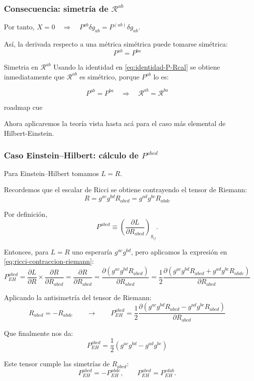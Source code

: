 \documentclass{beamer}
\newcommand{\Rcal}{\mathcal{R}}
\newcommand{\Eq}[1]{\eqref{#1}}
\newcommand{\RoadmapCue}[1]{%
    \begin{beamercolorbox}[
        wd=\textwidth,
        sep=.55ex,
        leftskip=.8ex,
        rounded=true
    ]{roadmap cue}

    \scriptsize
    \enspace #1

    \end{beamercolorbox}

    \vspace{.25em}
}
\begin{document}
\begin{frame}[label=nav-frame-017]
\frametitle{Consecuencia: simetría de \(\mathcal R^{ab}\)}

Por tanto, $X=0 \quad \Rightarrow \quad P^{ab}\delta g_{ab}=P^{(ab)}\delta g_{ab}$.

Así, la derivada respecto a una métrica simétrica puede tomarse simétrica:
\[
\boxed{P^{ab}=P^{ba}}
\]

\begin{block}{Simetria en $\Rcal^{ab}$}
Usando la identidad en \Eq{eq:identidad-P-Rcal} se obtiene inmediatamente que $\Rcal^{ab}$ es simétrico, porque $P^{ab}$ lo es:

\begin{equation}
P^{ab}=P^{ba}
\quad\Longrightarrow\quad
\Rcal^{ab}=\Rcal^{ba}
\label{eq:simetria-Rcal}
\end{equation}

\end{block}

\RoadmapCue{
Ahora aplicaremos la teoría vista hasta acá para el caso más elemental de Hilbert-Einstein.
}

\end{frame}

\begin{frame}[label=nav-frame-018]
\frametitle{Caso Einstein--Hilbert: cálculo de \(P^{abcd}\)}
\scriptsize

Para Einstein--Hilbert tomamos $L=R$.

Recordemos que el escalar de Ricci se obtiene contrayendo el tensor de Riemann:
\begin{equation}
R=g^{ac}g^{bd}R_{abcd} = g^{ad}g^{bc}R_{abdc}
\label{eq:ricci-contraccion-riemann}
\end{equation}

Por definición,
\[
P^{abcd}\equiv
\left(
\frac{\partial L}{\partial R_{abcd}}
\right)_{g_{ij}}.
\]

Entonces, para \(L=R\) uno esperaría \(g^{ac}g^{bd}\), pero aplicamos la expresión en \Eq{eq:ricci-contraccion-riemann}:
\[
P^{abcd}_{EH}
= \frac{\partial L}{\partial R} \times
\frac{\partial R}{\partial R_{abcd}} = \frac{\partial R}{\partial R_{abcd}} = \frac{\partial (g^{ac}g^{bd}R_{abcd})}{\partial R_{abcd}} = \frac{1}{2}\frac{\partial \left( g^{ac}g^{bd}R_{abcd} + g^{ad}g^{bc}R_{abdc} \right)}{\partial R_{abcd}}
\]

Aplicando la antisimetría del tensor de Riemann:
\[
R_{abcd}=-R_{abdc} \qquad \longrightarrow \qquad P^{abcd}_{EH} = \frac{1}{2}\frac{\partial \left( g^{ac}g^{bd}R_{abcd} - g^{ad}g^{bc}R_{abcd} \right)}{\partial R_{abcd}}
\]

Que finalmente nos da:
\begin{equation}
P^{abcd}_{EH} =\frac12 \left( g^{ac}g^{bd} - g^{ad}g^{bc} \right)
\label{eq:P-einstein-hilbert}
\end{equation}

Este tensor cumple las simetrías de \(R_{abcd}\):
\[
P^{abcd}_{EH}=-P^{abdc}_{EH},
\qquad
P^{abcd}_{EH}=P^{cdab}_{EH}.
\]

\end{frame}
\end{document}
